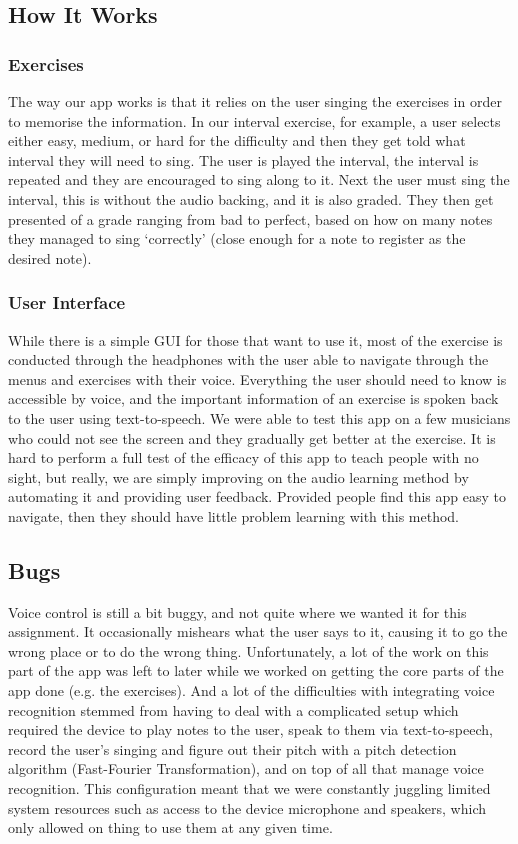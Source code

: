 \documentclass[10pt,a4paper]{article}
\begin{document}
\subsection{How It Works}
\subsubsection{Exercises}
The way our app works is that it relies on the user singing the exercises in order to memorise the information. In our interval exercise, for example, a user selects either easy, medium, or hard for the difficulty and then they get told what interval they will need to sing. The user is played the interval, the interval is repeated and they are encouraged to sing along to it. Next the user must sing the interval, this is without the audio backing, and it is also graded. They then get presented of a grade ranging from bad to perfect, based on how on many notes they managed to sing ‘correctly’ (close enough for a note to register as the desired note).
\subsubsection{User Interface}
While there is a simple GUI for those that want to use it, most of the exercise is conducted through the headphones with the user able to navigate through the menus and exercises with their voice.  Everything the user should need to know is accessible by voice, and the important information of an exercise is spoken back to the user using text-to-speech. We were able to test this app on a few musicians who could not see the screen and they gradually get better at the exercise. It is hard to perform a full test of the efficacy of this app to teach people with no sight, but really, we are simply improving on the audio learning method by automating it and providing user feedback. Provided people find this app easy to navigate, then they should have little problem learning with this method.

\subsection{Bugs}
Voice control is still a bit buggy, and not quite where we wanted it for this assignment. It occasionally mishears what the user says to it, causing it to go the wrong place or to do the wrong thing. Unfortunately, a lot of the work on this part of the app was left to later while we worked on getting the core parts of the app done (e.g. the exercises). And a lot of the difficulties with integrating voice recognition stemmed from having to deal with a complicated setup which required the device to play notes to the user, speak to them via text-to-speech, record the user’s singing and figure out their pitch with a pitch detection algorithm (Fast-Fourier Transformation), and on top of all that manage voice recognition. This configuration meant that we were constantly juggling limited system resources such as access to the device microphone and speakers, which only allowed on thing to use them at any given time.
\end{document}
